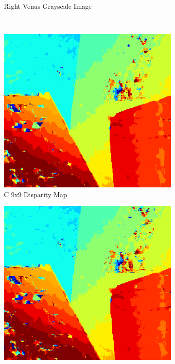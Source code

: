 \begin{figure}
\begin{center}
\begin{subfigure}{0.45\textwidth}
		\caption{Right Venus Grayscale Image}
		\label{fig:venusR}
	\end{subfigure}
	\\
	\begin{subfigure}{0.45\textwidth}
		\includegraphics[width=\textwidth]{figures/venus_c_9x9.png}
		\caption{C 9x9 Disparity Map}
		\label{fig:venusC9x9}
	\end{subfigure}
	\begin{subfigure}{0.45\textwidth}
		\includegraphics[width=\textwidth]{figures/venus_buffer_9x9_4.png}

\end{subfigure}
\end{center}
\end{figure}
